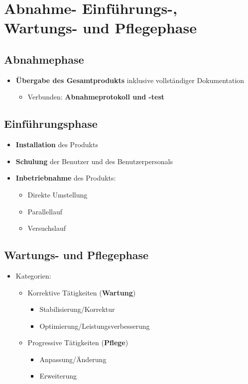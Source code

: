 \section{Abnahme- Einführungs-, Wartungs- und Pflegephase}
	
\subsection{Abnahmephase}
\begin{itemize}
\item \textbf{Übergabe des Gesamtprodukts} inklusive vollständiger Dokumentation
\begin{itemize}
\item Verbunden: \textbf{Abnahmeprotokoll und -test}
\end{itemize}
\end{itemize}
	
\subsection{Einführungsphase}

\begin{itemize}
\item \textbf{Installation} des Produkts
\item \textbf{Schulung} der Benutzer und des Benutzerpersonals
\item \textbf{Inbetriebnahme} des Produkts:
\begin{itemize}
\item Direkte Umstellung
\item Parallellauf
\item Versuchslauf
\end{itemize}
\end{itemize}
		
\subsection{Wartungs- und Pflegephase}

\begin{itemize}
\item Kategorien:
\begin{itemize}
\item Korrektive Tätigkeiten (\textbf{Wartung})
\begin{itemize}
\item Stabilisierung/Korrektur
\item Optimierung/Leistungsverbesserung
\end{itemize}
\item Progressive Tätigkeiten (\textbf{Pflege})
\begin{itemize}
\item Anpassung/Änderung
\item Erweiterung
\end{itemize}
\end{itemize}
\end{itemize}